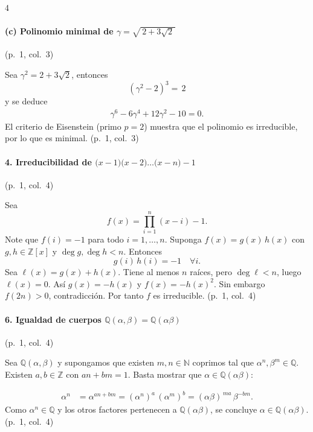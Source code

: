 \documentclass[landscape,a4paper]{article}
\begin{document}
\begin{multicols}{4}
\vspace{1em}
\paragraph{(c) Polinomio minimal de $\gamma=\sqrt{\,2+3\sqrt{2}\,}$}\hfill(p.~1, col.~3)

Sea $\gamma^2 = 2 + 3\sqrt{2}$, entonces 
\[
(\gamma^{2}-2)^{3}=\,2
\]
y se deduce
\begin{align}
\gamma^{6}-6\gamma^{4}+12\gamma^{2}-10 = 0.
\end{align}
El criterio de Eisenstein (primo $p=2$) muestra que el polinomio es irreducible, por lo que es minimal. (p.~1, col.~3)

\paragraph{4. Irreducibilidad de \(\bigl(x-1\bigr)\bigl(x-2\bigr)\dots\bigl(x-n\bigr)-1\)}\hfill(p.~1, col.~4)

Sea 
\[
f(x)=\prod_{i=1}^{n}(x-i) - 1.
\]
Note que $f(i)=-1$ para todo $i=1,\dots,n$.  Suponga $f(x)=g(x)\,h(x)$ con $g,h\in\mathbb{Z}[x]$ y $\deg g,\deg h<n$. Entonces
\[
g(i)\,h(i)=-1\quad\forall i.
\]
Sea \( \ell(x)=g(x)+h(x) \).  Tiene al menos \(n\) raíces, pero \(\deg \ell<n\), luego \(\ell(x)=0\).  Así \(g(x)=-h(x)\) y \(f(x)=-h(x)^{2}\).  
Sin embargo \(f(2n)>0\), contradicción.  Por tanto $f$ es irreducible. (p.~1, col.~4)

\vspace{1.2em}
\paragraph{6. Igualdad de cuerpos \(\mathbb{Q}(\alpha,\beta)=\mathbb{Q}(\alpha\beta)\)}\hfill(p.~1, col.~4)

Sea \(\mathbb{Q}(\alpha,\beta)\) y supongamos que existen \(m,n\in\mathbb{N}\) coprimos tal que \(\alpha^{n},\beta^{m}\in\mathbb{Q}\).  Existen \(a,b\in\mathbb{Z}\) con \(an+bm=1\).  
Basta mostrar que \(\alpha\in\mathbb{Q}(\alpha\beta)\):  

\begin{align}
\alpha^{n} &= \alpha^{an+bm} = (\alpha^{n})^{a}\,(\alpha^{m})^{b}
          = (\alpha\beta)^{\,m a}\,\beta^{-bm}.
\end{align}
Como \(\alpha^{n}\in\mathbb{Q}\) y los otros factores pertenecen a \(\mathbb{Q}(\alpha\beta)\), se concluye \(\alpha\in \mathbb{Q}(\alpha\beta)\).  (p.~1, col.~4)


\end{multicols}
\end{document}
